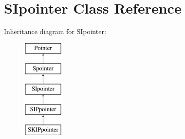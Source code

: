 \hypertarget{classSIpointer}{}\section{S\+Ipointer Class Reference}
\label{classSIpointer}
Inheritance diagram for S\+Ipointer\+:\begin{figure}[H]
\begin{center}
\leavevmode
\includegraphics[height=5.000000cm]{classSIpointer}
\end{center}
\end{figure}
